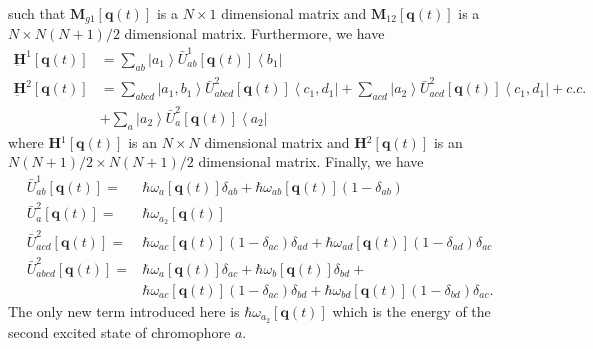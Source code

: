 \documentclass{article}
\newcommand{\bra}[1]{\ensuremath{\left\langle#1\right|}}
\newcommand{\ket}[1]{\ensuremath{\left|#1\right\rangle}}
\newcommand{\vect}[1]{\ensuremath{\boldsymbol{\mathbf{#1}}}}
\begin{document}
such that \underline{$\vect M$}$_{g1}[\vect q(t)]$ is a $N\times 1$ dimensional matrix and \underline{$\vect M$}$_{12}[\vect q(t)]$ is a $N\times N(N+1)/2$ dimensional matrix.
Furthermore, we have
\begin{equation}
\begin{split}
\underbar{\vect H}^{1}[\vect q(t)]&=\sum_{ab}\ket{a_{1}}\bar U_{ab}^{1}[\vect q(t)]\bra{b_{1}}\\
\underbar{\vect H}^{2}[\vect q(t)]&=\sum_{abcd}\ket{a_{1},b_{1}}\bar U_{abcd}^{2}[\vect q(t)]\bra{c_{1},d_{1}}+\sum_{acd}\ket{a_{2}}\bar U_{acd}^{2}[\vect q(t)]\bra{c_{1},d_{1}}+c.c.\\
				  &+\sum_{a}\ket{a_{2}}\bar U_{a}^{2}[\vect q(t)]\bra{a_{2}}
\end{split}
\end{equation}
where \underline{$\vect H$}$^{1}[\vect q(t)]$ is an $N\times N$ dimensional matrix and \underline{$\vect H$}$^{2}[\vect q(t)]$ is an $N(N+1)/2\times N(N+1)/2$ dimensional matrix.
Finally, we have
\begin{equation}
\begin{split}
\bar U_{ab}^{1}[\vect q(t)]=&\hbar\omega_{a}[\vect q(t)]\delta_{ab} + \hbar\omega_{ab}[\vect q(t)](1-\delta_{ab})\\
\bar U_{a}^{2}[\vect q(t)]=&\hbar\omega_{a_2}[\vect q(t)]\\ 
\bar U_{acd}^{2}[\vect q(t)]=&\hbar\omega_{ac}[\vect q(t)](1-\delta_{ac})\delta_{ad}+\hbar\omega_{ad}[\vect q(t)](1-\delta_{ad})\delta_{ac}\\
\bar U_{abcd}^{2}[\vect q(t)]=&\hbar\omega_{a}[\vect q(t)]\delta_{ac}+\hbar\omega_{b}[\vect q(t)]\delta_{bd} +\\ 
&\hbar\omega_{ac}[\vect q(t)](1-\delta_{ac})\delta_{bd} + \hbar\omega_{bd}[\vect q(t)](1-\delta_{bd})\delta_{ac}.
\end{split}
\end{equation}
The only new term introduced here is $\hbar\omega_{a_2}[\vect q(t)]$ which is the energy of the second excited state of chromophore $a$.
\end{document}
